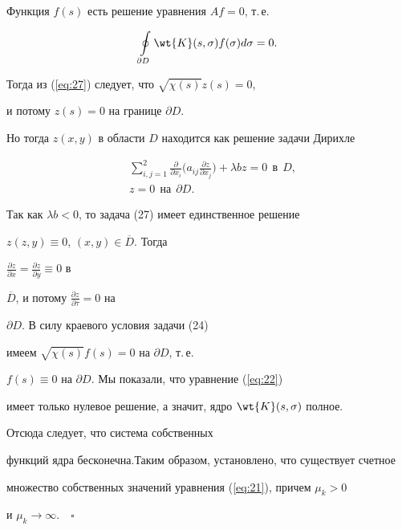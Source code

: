 Функция $f (s)$ есть решение уравнения $Af=0$, т.\,е.


\begin{equation}\label{eq:28}


\oint\limits_{\partial D} {\wt {K} ({s,\sigma })f (\sigma)d\sigma }=0.


\end{equation}


Тогда из (\ref{eq:27}) следует, что $\sqrt {\chi (s)} z (s)=0$,


и потому $z (s)=0$ на границе $\partial D$.


Но тогда $z ({x,y})$ в области $D$ находится как решение задачи Дирихле


\begin{align*}


&\sum\limits_{i,j=1}^2 {\frac{\partial }{\partial x_i }


\bigg({a_{ij} \frac{\partial z}{\partial x_j }} \bigg)+\lambda bz=0


\ \ \text{в} \ \ D,} \\


&z=0 \ \ \text{на} \ \ \partial D.


\end{align*}


Так как $\lambda b < 0$, то задача (27) имеет единственное решение


$z ({z,y}) \equiv 0$, $ ({x,y}) \in \overline D$. Тогда 


$\frac{\partial z}{\partial x}=\frac{\partial z}{\partial y} \equiv 0$ в 


$\overline D$, и потому $\frac{\partial z}{\partial \overline \tau }=0$ на 


$\partial D$. В силу краевого условия задачи (24)


имеем $\sqrt {\chi (s)} f (s)=0$ на $\partial D$, т.\,е.


$f(s) \equiv 0$ на $\partial D$. Мы показали, что уравнение (\ref{eq:22}) 


имеет только нулевое решение, а значит, ядро $\wt {K} ({s,\sigma })$ полное. 


Отсюда следует, что система собственных


функций ядра бесконечна.Таким образом, установлено, что существует счетное


множество собственных значений уравнения (\ref{eq:21}), причем $\mu _k > 0$


и $\mu _k \to \infty $.$\quad\square$






